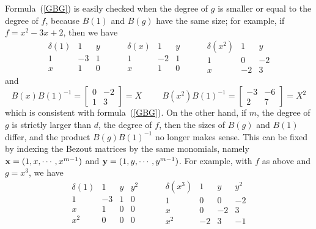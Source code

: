 \documentclass{standalone}
\begin{document}
Formula~(\ref{GBG}) is easily checked when the degree of $g$ is smaller or equal to the degree of $f$, because $B(1)$ and $B(g)$ have the same size;
for example, if $f = x^2 - 3x + 2$, then we have
$$
\begin{array}{c|cc}
	\delta(1) & 1 & y \\
	\hline
	1 & -3 & 1 \\
	x & 1 & 0
\end{array}
\hspace{1cm}
\begin{array}{c|cc}
	\delta(x) & 1 & y \\
	\hline
	1 & -2 & 1 \\
	x & 1 & 0
\end{array}
\hspace{1cm}
\begin{array}{c|cc}
	\delta(x^2) & 1 & y \\
	\hline
	1 & 0 & -2 \\
	x & -2 & 3
\end{array}
$$
and
\begin{equation}
	B(x)B(1)^{-1} =
	\begin{bmatrix}
		0 & -2 \\
		1 & 3
	\end{bmatrix}
	= X
	\hspace{1cm}
	B(x^2)B(1)^{-1} =
	\begin{bmatrix}
		-3 & -6 \\
		2 & 7
	\end{bmatrix}
	= X^2
\end{equation}
which is consistent with formula~(\ref{GBG}).
On the other hand, if $m$, the degree of $g$ is strictly larger than $d$, the degree of $f$, then the sizes of $B(g)$ and $B(1)$ differ, and the product $B(g)B(1)^{-1}$ no longer makes sense. 
This can be fixed by indexing the Bezout matrices by the same monomials, namely $\bold{x} = (1, x,\cdots, x^{m-1})$ and $\bold{y} = (1, y,\cdots, y^{m-1})$. 
For example, with $f$ as above and $g = x^3$, we have
$$
\begin{array}{c|ccc}
\delta(1) & 1 & y & y^2\\
\hline
1 & -3 & 1 & 0\\
x & 1 & 0 & 0\\
x^2 & 0 & 0 & 0
\end{array}
\hspace{1cm}
\begin{array}{c|ccc}
\delta(x^3) & 1 & y & y^2\\
\hline
1 & 0 & 0 & -2\\
x & 0 & -2 & 3\\
x^2 & -2 & 3 & -1
\end{array}
$$
\end{document}
